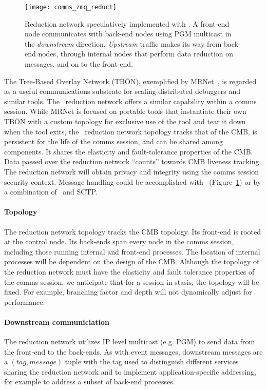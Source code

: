 \begin{figure}
\centering
\texttt{[image: comms\_zmq\_reduct]}
\caption{Reduction network speculatively implemented with \zMQ.
A front-end node communicates with back-end nodes using PGM multicast
in the {\em downstream} direction.  {\em Upstream} traffic makes its
way from back-end nodes, through internal nodes that perform data 
reduction on messages, and on to the front-end.}
\label{FigZmqTBON}
\end{figure}

The Tree-Based Overlay Network (TB\={O}N), exemplified by MRNet~\cite{MRNet},
is regarded as a useful communications substrate for scaling
distributed debuggers and similar tools.
The \ngrm\ reduction network offers a similar capability
within a comms session.
While MRNet is focused on portable tools that instantiate their own TB\={O}N
with a custom topology for exclusive use of the tool and tear it down when
the tool exits,
the \ngrm\ reduction network topology tracks that of the CMB,
is persistent for the life of the comms session,
and can be shared among components.
It shares the elasticity and fault-tolerance properties of the CMB.
Data passed over the reduction network ``counts'' towards CMB liveness
tracking.
The reduction network will obtain privacy and integrity using the comms
session security context.
Message handling could be accomplished with
\zMQ\ (Figure~\ref{FigZmqTBON}) or by a combination of \zMQ\ and SCTP.

\paragraph{Topology}
The reduction network topology tracks the CMB topology.
Its front-end is rooted at the control node.
Its back-ends span every node in the comms session, including those
running internal and front-end processes.
The location of internal processes will be dependent on the design of
the CMB.
Although the topology of the reduction network must have the elasticity
and fault tolerance properties of the comms session,
we anticipate that for a session in stasis, the topology will be fixed.
For example, branching factor and depth will not dynamically adjust for
performance.

\ifcomments
{}
\fi
\paragraph{Downstream communiciation}
The reduction network utilizes IP level multicast (e.g. PGM) to send
data from the front-end to the back-ends.
As with event messages, downstream messages are a
$(tag, message)$ tuple with the tag used to distinguish different
services sharing the reduction network and to implement application-specific
addressing, for example to address a subset of back-end processes.

